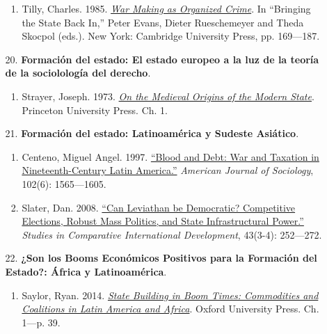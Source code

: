 \documentclass[letterpaper]{article}
\begin{document}
\begin{enumerate}
\begin{enumerate}
\begin{enumerate}
					\item Tilly, Charles. 1985. \href{https://github.com/hbahamonde/Ciencia_Politica_I/raw/master/Readings/Tilly.pdf}{\emph{War Making as Organized Crime}}. In ``Bringing the State Back In,'' Peter Evans, Dieter Rueschemeyer and Theda Skocpol (eds.). New York: Cambridge University Press, pp. 169---187.
				\end{enumerate}
			
			\item[20.] {\bf Formaci\'on del estado: El estado europeo a la luz de la teor\'ia de la sociololog\'ia del derecho}.
				\begin{enumerate} 
					\item Strayer, Joseph. 1973. \href{https://github.com/hbahamonde/Ciencia_Politica_I/raw/master/Readings/Strayer.pdf}{\emph{On the Medieval Origins of the Modern State}}. Princeton University Press. Ch. 1.\phantom{\textcite{}}
				\end{enumerate}

			\item[21.] {\bf Formaci\'on del estado: Latinoam\'erica y Sudeste Asi\'atico}.
				\begin{enumerate}
					\item Centeno, Miguel Angel. 1997. \href{https://github.com/hbahamonde/Ciencia_Politica_I/raw/master/Readings/Centeno.pdf}{``Blood and Debt: War and Taxation in Nineteenth-Century Latin America.''} \emph{American Journal of Sociology}, 102(6): 1565---1605. 
					
					\item Slater, Dan. 2008. \href{https://github.com/hbahamonde/Ciencia_Politica_I/raw/master/Readings/Slater.pdf}{``Can Leviathan be Democratic? Competitive Elections, Robust Mass Politics, and State Infrastructural Power.''} \emph{Studies in Comparative International Development}, 43(3-4): 252---272.
				\end{enumerate}

			\item[22.] {\bf ¿Son los Booms Econ\'omicos Positivos para la Formaci\'on del Estado?: \'Africa y Latinoam\'erica}.
				\begin{enumerate}
					\item Saylor, Ryan. 2014. \href{https://github.com/hbahamonde/Ciencia_Politica_I/raw/master/Readings/Saylor.pdf}{\emph{State Building in Boom Times: Commodities and Coalitions in Latin America and Africa}}. Oxford University Press. Ch. 1---p. 39.
					

\end{enumerate}
\end{enumerate}
\end{enumerate}
\end{document}
